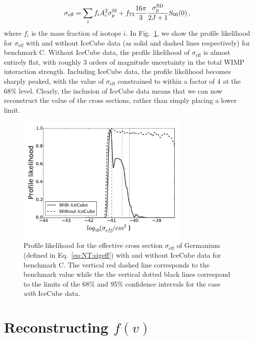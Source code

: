 \begin{equation}
\label{eq:NT:sigeff}
\sigma_\textrm{eff} = \sum_{i} f_i A_i^2 \sigmapsi + f_{73} \frac{16\pi}{3} \frac{\sigmapsd}{2J+1} S_{00}(0)\,,
\end{equation}
where $f_i$ is the mass fraction of isotope $i$. In Fig.~\ref{fig:NT:sigeff}, we show the profile likelihood for $\sigma_\textrm{eff}$ with and without IceCube data (as solid and dashed lines respectively) for benchmark C. Without IceCube data, the profile likelihood of $\sigma_\textrm{eff}$ is almost entirely flat, with roughly 3 orders of magnitude uncertainty in the total WIMP interaction strength. Including IceCube data, the profile likelihood becomes sharply peaked, with the value of $\sigma_\textrm{eff}$ constrained to within a factor of 4 at the 68\% level. Clearly, the inclusion of IceCube data means that we can now reconstruct the value of the cross sections, rather than simply placing a lower limit.

\begin{figure}[!ht]
  \centering
  \includegraphics[width=0.75\textwidth]{NT/final018-sigeff.pdf}
\caption{Profile likelihood for the effective cross section $\sigma_\textrm{eff}$ of Germanium (defined in Eq.~\ref{eq:NT:sigeff}) with and without IceCube data for benchmark C. The vertical red dashed line corresponds to the benchmark value while the the vertical dotted black lines correspond to the limits of the 68\% and 95\% confidence intervals for the case \textit{with} IceCube data.}
\label{fig:NT:sigeff}
\end{figure}


\section{Reconstructing $f(v)$}
\label{sec:NT:speeddist}

